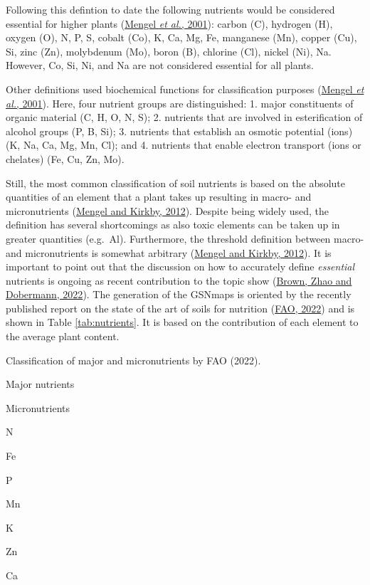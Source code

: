 \documentclass[
  10pt,
  b5paper,
  oneside]{book}
\begin{document}
Following this defintion to date the following nutrients would be considered essential for higher plants (\protect\hyperlink{ref-mengel2001}{Mengel \emph{et al.}, 2001}): carbon (C), hydrogen (H), oxygen (O), N, P, S, cobalt (Co), K, Ca, Mg, Fe, manganese (Mn), copper (Cu), Si, zinc (Zn), molybdenum (Mo), boron (B), chlorine (Cl), nickel (Ni), Na. However, Co, Si, Ni, and Na are not considered essential for all plants.

Other definitions used biochemical functions for classification purposes (\protect\hyperlink{ref-mengel2001}{Mengel \emph{et al.}, 2001}). Here, four nutrient groups are distinguished:
1. major constituents of organic material (C, H, O, N, S);
2. nutrients that are involved in esterification of alcohol groups (P, B, Si);
3. nutrients that establish an osmotic potential (ions) (K, Na, Ca, Mg, Mn, Cl); and
4. nutrients that enable electron transport (ions or chelates) (Fe, Cu, Zn, Mo).

Still, the most common classification of soil nutrients is based on the absolute quantities of an element that a plant takes up resulting in macro- and micronutrients (\protect\hyperlink{ref-mengel2012}{Mengel and Kirkby, 2012}). Despite being widely used, the definition has several shortcomings as also toxic elements can be taken up in greater quantities (e.g.~Al). Furthermore, the threshold definition between macro- and micronutrients is somewhat arbitrary (\protect\hyperlink{ref-mengel2012}{Mengel and Kirkby, 2012}).
It is important to point out that the discussion on how to accurately define \emph{essential} nutrients is ongoing as recent contribution to the topic show (\protect\hyperlink{ref-brown2022}{Brown, Zhao and Dobermann, 2022}). The generation of the GSNmaps is oriented by the recently published report on the state of the art of soils for nutrition (\protect\hyperlink{ref-symposium2022}{FAO, 2022}) and is shown in Table \ref{tab:nutrients}. It is based on the contribution of each element to the average plant content.

\label{tab:nutrients}Classification of major and micronutrients by FAO (2022).

Major nutrients

Micronutrients

N

Fe

P

Mn

K

Zn

Ca
\end{document}
